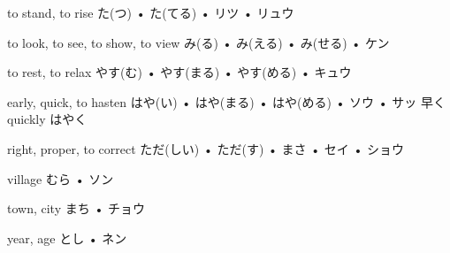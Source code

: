 



\setcounter{cardnum}{65}

		{to stand, to rise}
		{た(つ) • た(てる) • リツ • リュウ}
		{}{}
		{}{}
		{}{}
		{}{}
		{}{}

		{to look, to see, to show, to view}
		{み(る) • み(える) • み(せる) • ケン}
		{}{}
		{}{}
		{}{}
		{}{}
		{}{}

		{to rest, to relax}
		{やす(む) • やす(まる) • やす(める) • キュウ}
		{}{}
		{}{}
		{}{}
		{}{}
		{}{}

		{early, quick, to hasten}
		{はや(い) • はや(まる) • はや(める) • ソウ • サッ}
		{早く}{quickly はやく}
		{}{}
		{}{}
		{}{}
		{}{}

		{right, proper, to correct}
		{ただ(しい) • ただ(す) • まさ • セイ • ショウ}
		{}{}
		{}{}
		{}{}
		{}{}
		{}{}

		{village}
		{むら • ソン}
		{}{}
		{}{}
		{}{}
		{}{}
		{}{}

		{town, city}
		{まち • チョウ}
		{}{}
		{}{}
		{}{}
		{}{}
		{}{}

		{year, age}
		{とし • ネン}
		{}{}
		{}{}
		{}{}
		{}{}
		{}{}

